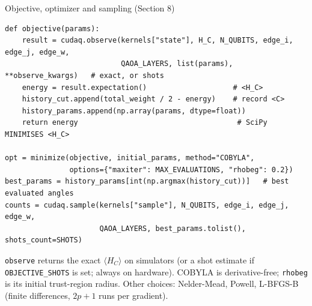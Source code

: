 \documentclass[aspectratio=169,11pt]{beamer}
\begin{document}
\begin{frame}[fragile]{Objective, optimizer and sampling (Section 8)}
\begin{lstlisting}
def objective(params):
    result = cudaq.observe(kernels["state"], H_C, N_QUBITS, edge_i, edge_j, edge_w,
                           QAOA_LAYERS, list(params), **observe_kwargs)   # exact, or shots
    energy = result.expectation()                    # <H_C>
    history_cut.append(total_weight / 2 - energy)    # record <C>
    history_params.append(np.array(params, dtype=float))
    return energy                                     # SciPy MINIMISES <H_C>

opt = minimize(objective, initial_params, method="COBYLA",
               options={"maxiter": MAX_EVALUATIONS, "rhobeg": 0.2})
best_params = history_params[int(np.argmax(history_cut))]   # best evaluated angles
counts = cudaq.sample(kernels["sample"], N_QUBITS, edge_i, edge_j, edge_w,
                      QAOA_LAYERS, best_params.tolist(), shots_count=SHOTS)
\end{lstlisting}
  \small \texttt{observe} returns the exact $\langle H_C\rangle$ on simulators (or a shot estimate if \texttt{OBJECTIVE\_SHOTS} is set; always
  on hardware). COBYLA is derivative-free; \texttt{rhobeg} is its initial trust-region radius. Other choices:
  Nelder-Mead, Powell, L-BFGS-B (finite differences, $2p+1$ runs per gradient).
\end{frame}
\end{document}

